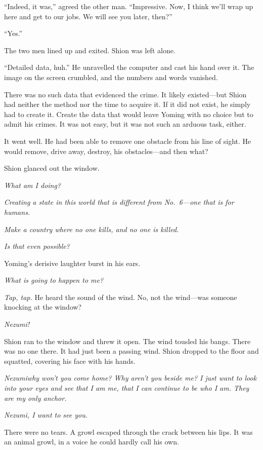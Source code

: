 ``Indeed, it was,'' agreed the other man. ``Impressive. Now, I think
we'll wrap up here and get to our jobs. We will see you later, then?''

``Yes.''

The two men lined up and exited. Shion was left alone.

``Detailed data, huh.'' He unravelled the computer and cast his hand
over it. The image on the screen crumbled, and the numbers and words
vanished.

There was no such data that evidenced the crime. It likely existed---but
Shion had neither the method nor the time to acquire it. If it did not
exist, he simply had to create it. Create the data that would leave
Yoming with no choice but to admit his crimes. It was not easy, but it
was not such an arduous task, either.

It went well. He had been able to remove one obstacle from his line of
sight. He would remove, drive away, destroy, his obstacles---and then
what?

Shion glanced out the window.

\emph{What am I doing?}

\emph{Creating a state in this world that is different from No.~6---one that is
for humans.}

\emph{Make a country where no one kills, and no one is killed.}

\emph{Is that even possible?}

Yoming's derisive laughter burst in his ears.

\emph{What is going to happen to me?}

\mybreak

\emph{Tap, tap.} He heard the sound of the wind. No, not the wind---was someone
knocking at the window?

\emph{Nezumi!}

Shion ran to the window and threw it open. The wind tousled his bangs.
There was no one there. It had just been a passing wind. Shion dropped
to the floor and squatted, covering his face with his hands.

\emph{Nezumi\el why won't you come home? Why aren't you beside me? I just want
to look into your eyes and see that I am me, that I can continue to be
who I am. They are my only anchor.}

\emph{Nezumi, I want to see you.}

There were no tears. A growl escaped through the crack between his lips.
It was an animal growl, in a voice he could hardly call his own.

